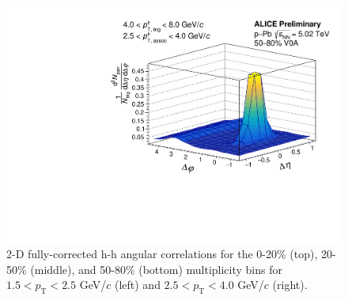 \begin{figure}[ht]
\begin{minipage}{0.48\textwidth}
		\includegraphics[width=\textwidth]{figures/analysis/h_h_2d_mixcor_fancy_label_50_80_highpt.pdf}
	\end{minipage}
	\caption{2-D fully-corrected h-h angular correlations for the 0-20\% (top), 20-50\% (middle), and 50-80\% (bottom) multiplicity bins for $1.5 < p_{\text{T}} < 2.5$ GeV/$c$ (left) and $2.5 < p_{\text{T}} < 4.0$ GeV/$c$ (right).}
	\label{fig:h_h_2d_final}
\end{figure}

\clearpage